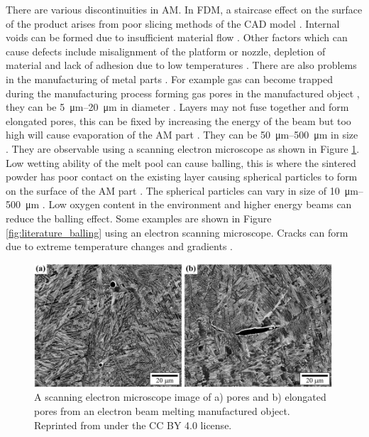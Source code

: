 There are various discontinuities in AM. In FDM, a staircase effect on the surface of the product arises from poor slicing methods of the CAD model \citep{weeren1995quality}. Internal voids can be formed due to insufficient material flow \citep{weeren1995quality}. Other factors which can cause defects include misalignment of the platform or nozzle, depletion of material and lack of adhesion due to low temperatures \citep{gunaydin2018common}. There are also problems in the manufacturing of metal parts \citep{everton2016review}. For example gas can become trapped during the manufacturing process forming gas pores in the manufactured object \citep{thijs2010study, tammas2015xct}, they can be \SIrange{5}{20}{\micro\metre} in diameter \citep{everton2016review}. Layers may not fuse together and form elongated pores, this can be fixed by increasing the energy of the beam but too high will cause evaporation of the AM part \citep{mumtaz2008high}. They can be \SIrange{50}{500}{\micro\metre} in size \citep{everton2016review}. They are observable using a scanning electron microscope as shown in Figure \ref{fig:literature_pores}. Low wetting ability of the melt pool can cause balling, this is where the sintered powder has poor contact on the existing layer causing spherical particles to form on the surface of the AM part \citep{li2012balling, gu2009balling}. The spherical particles can vary in size of \SIrange{10}{500}{\micro\metre} \citep{li2012balling}. Low oxygen content in the environment \citep{niu1999instability} and higher energy beams \citep{gu2009balling} can reduce the balling effect. Some examples are shown in Figure \ref{fig:literature_balling} using an electron scanning microscope. Cracks can form due to extreme temperature changes and gradients \citep{mercelis2006residual, zaeh2010investigations}.

\begin{figure}
  \centering
  \includegraphics[width=0.99\textwidth]{../figures/literatureReview/literature_pores.png}
  \caption{A scanning electron microscope image of a) pores and b) elongated pores from an electron beam melting manufactured object. Reprinted from \cite{tammas2015xct} under the CC BY 4.0 license.}
  \label{fig:literature_pores}
\end{figure}

